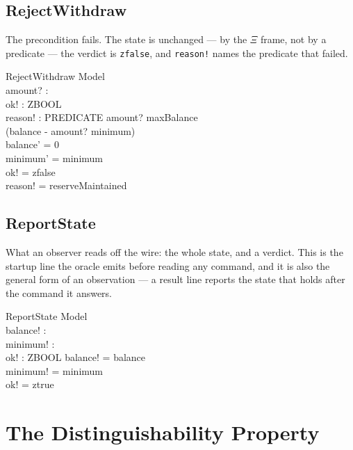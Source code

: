 \documentclass[a4paper,10pt,fleqn]{article}
\begin{document}
\subsection{RejectWithdraw}

The precondition fails. The state is unchanged --- by the $\Xi$ frame,
not by a predicate --- the verdict is \texttt{zfalse}, and
\texttt{reason!} names the predicate that failed.

\begin{schema}{RejectWithdraw}
  \Delta Model \\
  amount? : \nat \\
  ok! : ZBOOL \\
  reason! : PREDICATE
  \where
  amount? \leq maxBalance \\
  \lnot (balance - amount? \geq minimum) \\
  balance' = 0 \\
  minimum' = minimum \\
  ok! = zfalse \\
  reason! = reserveMaintained
\end{schema}

\subsection{ReportState}

What an observer reads off the wire: the whole state, and a verdict. This
is the startup line the oracle emits before reading any command, and it
is also the general form of an observation --- a result line reports the
state that holds after the command it answers.

\begin{schema}{ReportState}
  \Xi Model \\
  balance! : \nat \\
  minimum! : \nat \\
  ok! : ZBOOL
  \where
  balance! = balance \\
  minimum! = minimum \\
  ok! = ztrue
\end{schema}

\section{The Distinguishability Property}
\end{document}
